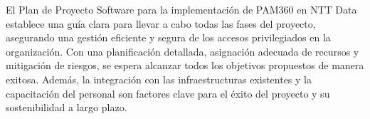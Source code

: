 El Plan de Proyecto Software para la implementación de PAM360 en NTT Data establece una guía clara para llevar a cabo todas las fases del proyecto, asegurando una gestión eficiente y segura de los accesos privilegiados en la organización. Con una planificación detallada, asignación adecuada de recursos y mitigación de riesgos, se espera alcanzar todos los objetivos propuestos de manera exitosa. Además, la integración con las infraestructuras existentes y la capacitación del personal son factores clave para el éxito del proyecto y su sostenibilidad a largo plazo.


